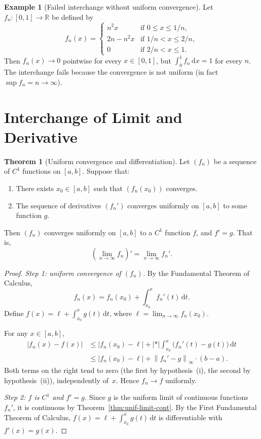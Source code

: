 \documentclass[12pt,a4paper]{book}
\theoremstyle{definition}
\newtheorem{theorem}{Theorem}[chapter]
\newtheorem{example}{Example}[chapter]
\newcommand{\R}{\mathbb{R}}
\newcommand{\abs}[1]{\left\lvert #1 \right\rvert}
\newcommand{\norm}[1]{\left\lVert #1 \right\rVert}
\newcommand{\dd}{\,\mathrm{d}}
\begin{document}
\begin{example}[Failed interchange without uniform convergence]\label{ex:failed-int-interchange}
  Let $f_n\colon[0,1]\to\R$ be defined by
  \[
    f_n(x) = \begin{cases}
      n^2 x & \text{if } 0\le x\le 1/n,\\
      2n - n^2 x & \text{if } 1/n < x\le 2/n,\\
      0 & \text{if } 2/n < x\le 1.
    \end{cases}
  \]
  Then $f_n(x)\to0$ pointwise for every $x\in[0,1]$, but
  $\int_0^1 f_n\dd x = 1$ for every $n$.  The interchange fails because
  the convergence is not uniform (in fact $\sup f_n=n\to\infty$).
\end{example}


\section{Interchange of Limit and Derivative}\label{sec:interchange-deriv}

\begin{theorem}[Uniform convergence and differentiation]\label{thm:unif-diff}
  Let $(f_n)$ be a sequence of $C^1$ functions on $[a,b]$.  Suppose that:
  \begin{enumerate}[label=(\roman*)]
    \item There exists $x_0\in[a,b]$ such that $(f_n(x_0))$ converges.
    \item The sequence of derivatives $(f_n')$ converges uniformly on
      $[a,b]$ to some function $g$.
  \end{enumerate}
  Then $(f_n)$ converges uniformly on $[a,b]$ to a $C^1$ function $f$,
  and $f'=g$.  That is,
  \[
    \left(\lim_{n\to\infty}f_n\right)' = \lim_{n\to\infty}f_n'.
  \]
\end{theorem}

\begin{proof}
  \emph{Step 1: uniform convergence of $(f_n)$.}\;
  By the Fundamental Theorem of Calculus,
  \[
    f_n(x) = f_n(x_0) + \int_{x_0}^x f_n'(t)\dd t.
  \]
  Define $f(x) = \ell + \int_{x_0}^x g(t)\dd t$, where
  $\ell=\lim_{n\to\infty}f_n(x_0)$.

  For any $x\in[a,b]$,
  \begin{align*}
    \abs{f_n(x)-f(x)}
    &\le \abs{f_n(x_0)-\ell} + \abs*{\int_{x_0}^x\bigl(f_n'(t)-g(t)\bigr)\dd t}\\
    &\le \abs{f_n(x_0)-\ell} + \norm{f_n'-g}_\infty\cdot(b-a).
  \end{align*}
  Both terms on the right tend to zero (the first by hypothesis~(i), the
  second by hypothesis~(ii)), independently of~$x$.  Hence $f_n\to f$
  uniformly.

  \emph{Step 2: $f$ is $C^1$ and $f'=g$.}\;
  Since $g$ is the uniform limit of continuous functions $f_n'$, it is
  continuous by Theorem~\ref{thm:unif-limit-cont}.  By the First
  Fundamental Theorem of Calculus,
  $\displaystyle f(x)=\ell+\int_{x_0}^x g(t)\dd t$ is differentiable with
  $f'(x)=g(x)$.
\end{proof}
\end{document}
